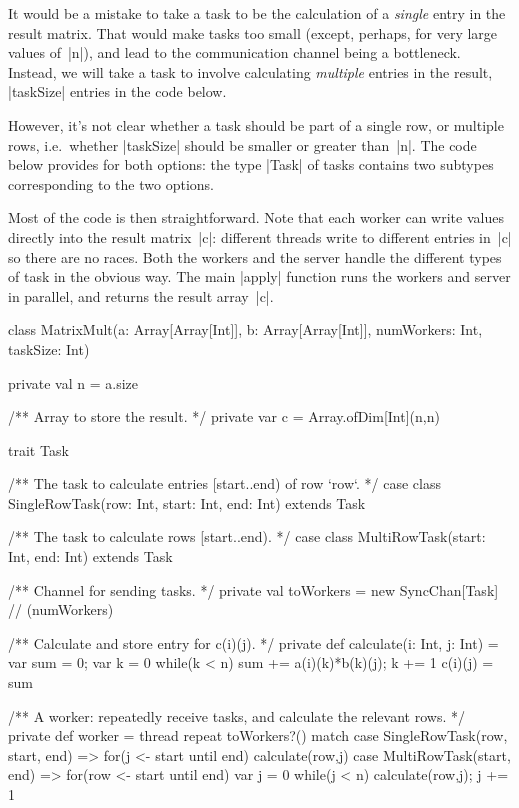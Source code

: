 \begin{answerI}
It would be a mistake to take a task to be the calculation of a \emph{single}
entry in the result matrix.  That would make tasks too small (except, perhaps,
for very large values of~|n|), and lead to the communication channel being a
bottleneck.  Instead, we will take a task to involve calculating
\emph{multiple} entries in the result, |taskSize| entries in the code below.  

However, it's not clear whether a task should be part of a single row, or
multiple rows, i.e.~whether |taskSize| should be smaller or greater than~|n|.
The code below provides for both options: the type |Task| of tasks contains
two subtypes corresponding to the two options.

Most of the code is then straightforward.  Note that each worker can write
values directly into the result matrix~|c|: different threads write to
different entries in~|c| so there are no races.  Both the workers and the
server handle the different types of task in the obvious way.  The main
|apply| function runs the workers and server in parallel, and returns the
result array~|c|.
%
\begin{scala}
class MatrixMult(a: Array[Array[Int]], b: Array[Array[Int]],
             numWorkers: Int, taskSize: Int){
  private val n = a.size

  /** Array to store the result. */
  private var c = Array.ofDim[Int](n,n)

  trait Task

  /** The task to calculate entries [start..end) of row `row`. */
  case class SingleRowTask(row: Int, start: Int, end: Int) extends Task 

  /** The task to calculate rows [start..end). */
  case class MultiRowTask(start: Int, end: Int) extends Task

  /** Channel for sending tasks. */
  private val toWorkers = new SyncChan[Task] // (numWorkers)

  /** Calculate and store entry for c(i)(j). */
  private def calculate(i: Int, j: Int) = {
    var sum = 0; var k = 0
    while(k < n){ sum += a(i)(k)*b(k)(j); k += 1 }
    c(i)(j) = sum
  }

  /** A worker: repeatedly receive tasks, and calculate the relevant rows. */
  private def worker = thread{
    repeat{
      toWorkers?() match{
        case SingleRowTask(row, start, end) =>
          for(j <- start until end) calculate(row,j)
        case MultiRowTask(start, end) => 
          for(row <- start until end){
            var j = 0
            while(j < n){ calculate(row,j); j += 1 }
          }
      }
    }
  }

}
\end{scala}
\end{answerI}
